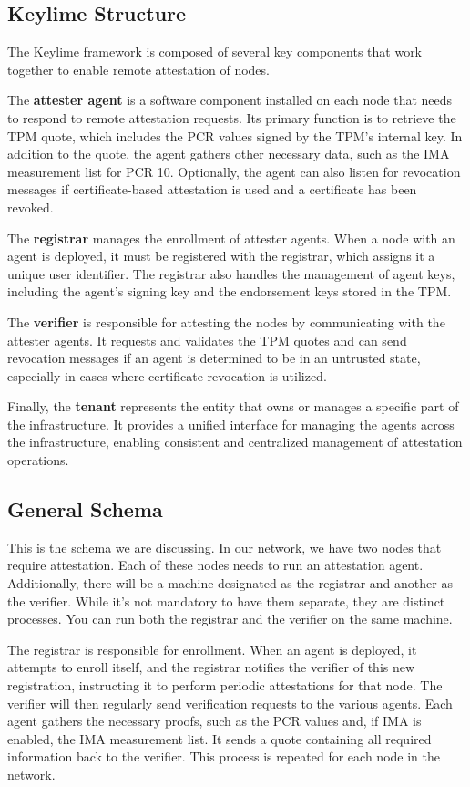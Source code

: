 \subsection{Keylime Structure}

The Keylime framework is composed of several key components that work
together to enable remote attestation of nodes. 

The \textbf{attester agent} is a software component installed on each
node that needs to respond to remote attestation requests. Its primary
function is to retrieve the TPM quote, which includes the PCR values
signed by the TPM’s internal key. In addition to the quote, the agent
gathers other necessary data, such as the IMA measurement list for PCR
10. Optionally, the agent can also listen for revocation messages if
certificate-based attestation is used and a certificate has been
revoked.

The \textbf{registrar} manages the enrollment of attester agents. When
a node with an agent is deployed, it must be registered with the
registrar, which assigns it a unique user identifier. The registrar
also handles the management of agent keys, including the agent’s
signing key and the endorsement keys stored in the TPM.

The \textbf{verifier} is responsible for attesting the nodes by
communicating with the attester agents. It requests and validates the
TPM quotes and can send revocation messages if an agent is determined
to be in an untrusted state, especially in cases where certificate
revocation is utilized.

Finally, the \textbf{tenant} represents the entity that owns or
manages a specific part of the infrastructure. It provides a unified
interface for managing the agents across the infrastructure, enabling
consistent and centralized management of attestation operations.

\subsection{General Schema}
This is the schema we are discussing. In our network, we have two
nodes that require attestation. Each of these nodes needs to run an
attestation agent. Additionally, there will be a machine designated as
the registrar and another as the verifier. While it's not mandatory to
have them separate, they are distinct processes. You can run both the
registrar and the verifier on the same machine.

The registrar is responsible for enrollment. When an agent is
deployed, it attempts to enroll itself, and the registrar notifies the
verifier of this new registration, instructing it to perform periodic
attestations for that node. The verifier will then regularly send
verification requests to the various agents. Each agent gathers the
necessary proofs, such as the PCR values and, if IMA is enabled, the
IMA measurement list. It sends a quote containing all required
information back to the verifier. This process is repeated for each
node in the network.

